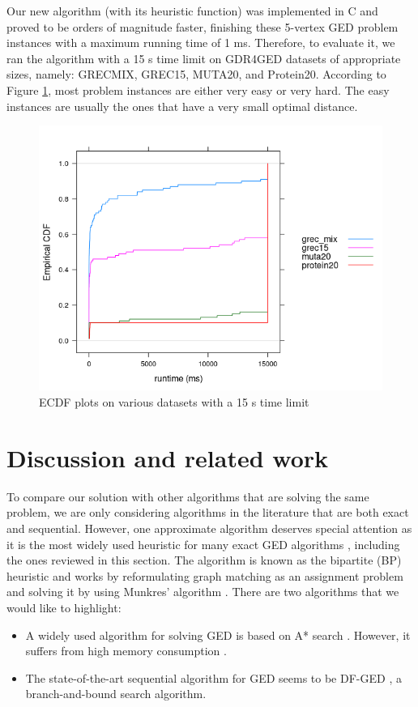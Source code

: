 \documentclass{article}
\theoremstyle{definition}
\begin{document}
Our new algorithm (with its heuristic function) was implemented in C and proved to be orders of magnitude faster, finishing these 5-vertex GED problem instances with a maximum running time of 1 ms. Therefore, to evaluate it, we ran the algorithm with a 15 s time limit on GDR4GED datasets of appropriate sizes, namely: GRECMIX, GREC15, MUTA20, and Protein20. According to Figure \ref{fig:ecdf}, most problem instances are either very easy or very hard. The easy instances are usually the ones that have a very small optimal distance.
\begin{figure}
  \includegraphics[scale=0.75]{ecdfs.png}
  \caption{ECDF plots on various datasets with a 15 s time limit}
  \label{fig:ecdf}
\end{figure}
\section{Discussion and related work}
To compare our solution with other algorithms that are solving the same problem, we are only considering algorithms in the literature that are both exact and sequential. However, one approximate algorithm deserves special attention as it is the most widely used heuristic for many exact GED algorithms \cite{abu-aisheh_raveaux_ramel_martineau_2015}, including the ones reviewed in this section. The algorithm is known as the bipartite (BP) heuristic and works by reformulating graph matching as an assignment problem and solving it by using Munkres' algorithm \cite{riesen_bunke_2009}. There are two algorithms that we would like to highlight:
\begin{itemize}
\item A widely used algorithm for solving GED is based on A* search \cite{riesen_fankhauser_bunke_2011}. However, it suffers from high memory consumption \cite{abu-aisheh_raveaux_ramel_martineau_2015}.
\item The state-of-the-art sequential algorithm for GED seems to be DF-GED \cite{abu-aisheh_raveaux_ramel_martineau_2015}, a branch-and-bound search algorithm.
\end{itemize}
\end{document}
